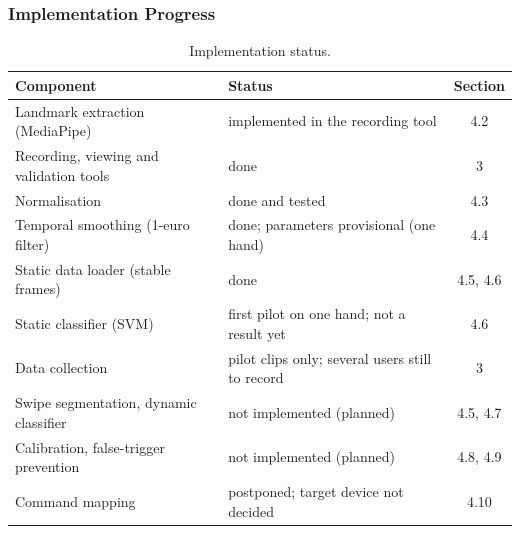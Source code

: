 \subsubsection*{Implementation Progress}
\begin{table}[H]
\centering
\begin{tabular}{@{}lp{6.8cm}c@{}}
\toprule
Component & Status & Section \\
\midrule
Landmark extraction (MediaPipe) & implemented in the recording tool & 4.2 \\
Recording, viewing and validation tools & done & 3 \\
Normalisation & done and tested & 4.3 \\
Temporal smoothing (1-euro filter) & done; parameters provisional (one hand) & 4.4 \\
Static data loader (stable frames) & done & 4.5, 4.6 \\
Static classifier (SVM) & first pilot on one hand; not a result yet & 4.6 \\
Data collection & pilot clips only; several users still to record & 3 \\
Swipe segmentation, dynamic classifier & not implemented (planned) & 4.5, 4.7 \\
Calibration, false-trigger prevention & not implemented (planned) & 4.8, 4.9 \\
Command mapping & postponed; target device not decided & 4.10 \\
\bottomrule
\end{tabular}
\caption{Implementation status. }
\end{table}
\fi

